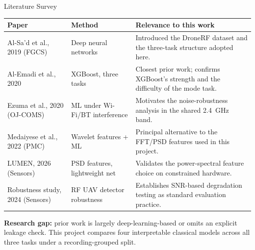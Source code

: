 \documentclass[aspectratio=169,11pt]{beamer}
\begin{document}
\begin{frame}{Literature Survey}
\scriptsize
\begin{tabular}{|p{3.1cm}|p{2.7cm}|p{5.7cm}|}
\hline
\textbf{Paper} & \textbf{Method} & \textbf{Relevance to this work} \\
\hline
Al-Sa'd et al., 2019 (FGCS) & Deep neural networks &
Introduced the DroneRF dataset and the three-task structure adopted here. \\
\hline
Al-Emadi et al., 2020 & XGBoost, three tasks &
Closest prior work; confirms XGBoost's strength and the difficulty of the mode
task. \\
\hline
Ezuma et al., 2020 (OJ-COMS) & ML under Wi-Fi/BT interference &
Motivates the noise-robustness analysis in the shared 2.4~GHz band. \\
\hline
Medaiyese et al., 2022 (PMC) & Wavelet features + ML &
Principal alternative to the FFT/PSD features used in this project. \\
\hline
LUMEN, 2026 (Sensors) & PSD features, lightweight net &
Validates the power-spectral feature choice on constrained hardware. \\
\hline
Robustness study, 2024 (Sensors) & RF UAV detector robustness &
Establishes SNR-based degradation testing as standard evaluation practice. \\
\hline
\end{tabular}
\vspace{0.2cm}

\footnotesize\textbf{Research gap:} prior work is largely deep-learning-based or
omits an explicit leakage check. This project compares four interpretable
classical models across all three tasks under a recording-grouped split.
\end{frame}
\end{document}
